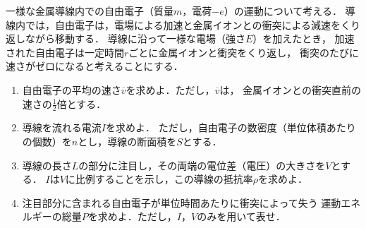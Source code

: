 \documentclass[../../../physics-standard_questions_all.tex]{subfiles}
\begin{document}
\setlength{\abovedisplayskip}{2mm}
\setlength{\belowdisplayskip}{1mm}

一様な金属導線内での自由電子（質量$m$，電荷$-e$）の運動について考える．
導線内では，自由電子は，電場による加速と金属イオンとの衝突による減速をくり返しながら移動する．
導線に沿って一様な電場（強さ$E$）を加えたとき，
加速された自由電子は一定時間$r$ごとに金属イオンと衝突をくり返し，
衝突のたびに速さがゼロになると考えることにする．

\begin{enumerate}
    \item 自由電子の平均の速さ$\overline{v}$を求めよ．ただし，$\overline{v}$は，
        金属イオンとの衝突直前の速さの$\displaystyle \frac{1}{2}$倍とする．

    \item 導線を流れる電流$I$を求めよ．
        ただし，自由電子の数密度（単位体積あたりの個数）を$n$とし，導線の断面積を$S$とする．

    \item 導線の長さ$L$の部分に注目し，その両端の電位差（電圧）の大きさを$V$とする．
        $I$は$V$に比例することを示し，この導線の抵抗率$\rho$を求めよ．

    \item 注目部分に含まれる自由電子が単位時間あたりに衝突によって失う
        運動エネルギーの総量$P$を求めよ．ただし，$I$，$V$のみを用いて表せ．
    
    
\end{enumerate}
\end{document}
